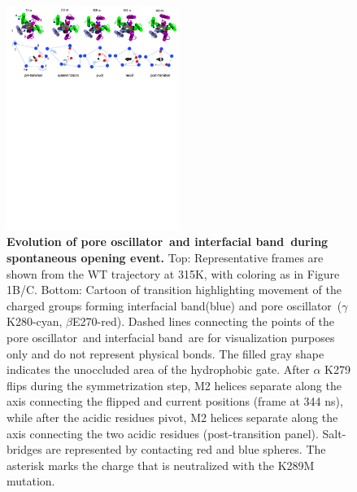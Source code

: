 \documentclass[journal=jacsat,manuscript=article]{achemso}
\newcommand{\grace}[1]{\textcolor{blue}{#1}}
\newcommand{\fivering}{interfacial band~}
\newcommand{\fiveringnos}{interfacial band}
\newcommand{\triad}{pore oscillator~}
\newcommand{\WT}{WT\xspace}
\begin{document}
\begin{figure}[t]
\begin{center}
\includegraphics[width =0.5\textwidth]{figures_2/Cartoonv4}
\end{center}
\caption{{\bf Evolution of \triad and \fivering during spontaneous opening event.} Top: Representative frames are shown from the \WT trajectory at 315K, with coloring as in Figure 1B/C. Bottom: Cartoon of transition highlighting movement of the charged groups forming \fiveringnos (blue) and \triad ($\gamma$K280-cyan, $\beta$E270-red).  Dashed lines connecting the points of the \triad and \fivering are for visualization purposes only and do not represent physical bonds. The filled gray shape indicates the unoccluded area of the hydrophobic gate. After $\alpha$ K279 flips during the symmetrization step, M2 helices separate along the axis connecting the flipped and current positions (frame at 344 ns), while after the acidic residues pivot, M2 helices separate along the axis connecting the two acidic residues (post-transition panel). Salt-bridges are represented by contacting red and blue spheres. The asterisk marks the charge that is neutralized with the K289M mutation.} 
\label{fig:Pillar_2_graphs_network}
\end{figure}
\end{document}
